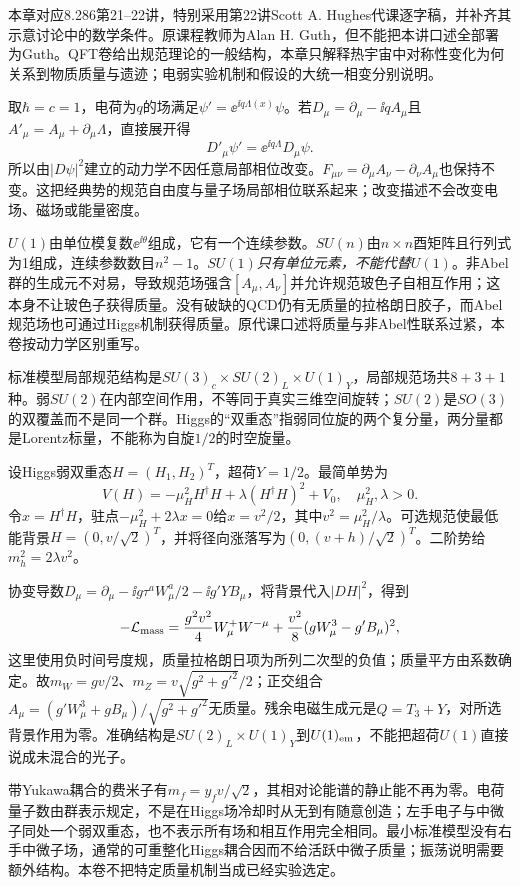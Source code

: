 本章对应8.286第21--22讲，特别采用第22讲Scott A. Hughes代课逐字稿，并补齐其示意讨论中的数学条件。原课程教师为Alan H. Guth，但不能把本讲口述全部署为Guth。QFT卷给出规范理论的一般结构，本章只解释热宇宙中对称性变化为何关系到物质质量与遗迹；电弱实验机制和假设的大统一相变分别说明。

取$\hbar=c=1$，电荷为$q$的场满足$\psi'=\ee^{\ii q\Lambda(x)}\psi$。若$D_\mu=\partial_\mu-\ii q A_\mu$且$A'_\mu=A_\mu+\partial_\mu\Lambda$，直接展开得
\[
 D'_\mu\psi'=\ee^{\ii q\Lambda}D_\mu\psi.
\]
所以由$|D\psi|^2$建立的动力学不因任意局部相位改变。$F_{\mu\nu}=\partial_\mu A_\nu-\partial_\nu A_\mu$也保持不变。这把经典势的规范自由度与量子场局部相位联系起来；改变描述不会改变电场、磁场或能量密度。

$U(1)$由单位模复数$\ee^{\ii\theta}$组成，它有一个连续参数。$SU(n)$由$n\times n$酉矩阵且行列式为1组成，连续参数数目$n^2-1$。\emph{$SU(1)$只有单位元素，不能代替$U(1)$}。非Abel群的生成元不对易，导致规范场强含$[A_\mu,A_\nu]$并允许规范玻色子自相互作用；这本身不让玻色子获得质量。没有破缺的QCD仍有无质量的拉格朗日胶子，而Abel规范场也可通过Higgs机制获得质量。原代课口述将质量与非Abel性联系过紧，本卷按动力学区别重写。

标准模型局部规范结构是$SU(3)_c\times SU(2)_L\times U(1)_Y$，局部规范场共$8+3+1$种。弱$SU(2)$在内部空间作用，不等同于真实三维空间旋转；$SU(2)$是$SO(3)$的双覆盖而不是同一个群。Higgs的“双重态”指弱同位旋的两个复分量，两分量都是Lorentz标量，不能称为自旋$1/2$的时空旋量。

设Higgs弱双重态$H=(H_1,H_2)^T$，超荷$Y=1/2$。最简单势为
\[
 V(H)=-\mu_H^2 H^\dagger H+\lambda(H^\dagger H)^2+V_0,
 \quad \mu_H^2,\lambda>0.
\]
令$x=H^\dagger H$，驻点$-\mu_H^2+2\lambda x=0$给$x=v^2/2$，其中$v^2=\mu_H^2/\lambda$。可选规范使最低能背景$H=(0,v/\sqrt2)^T$，并将径向涨落写为$(0,(v+h)/\sqrt2)^T$。二阶势给$m_h^2=2\lambda v^2$。

协变导数$D_\mu=\partial_\mu-\ii g\tau^aW^a_\mu/2-\ii g'YB_\mu$，将背景代入$|DH|^2$，得到
\[
 -\mathcal L_{\rm mass}=
 \frac{g^2v^2}{4}W^+_\mu W^{-\mu}
 +\frac{v^2}{8}(gW^3_\mu-g'B_\mu)^2,
\]
这里使用负时间号度规，质量拉格朗日项为所列二次型的负值；质量平方由系数确定。故$m_W=gv/2$、$m_Z=v\sqrt{g^2+g'^2}/2$；正交组合$A_\mu=(g'W^3_\mu+gB_\mu)/\sqrt{g^2+g'^2}$无质量。残余电磁生成元是$Q=T_3+Y$，对所选背景作用为零。准确结构是$SU(2)_L\times U(1)_Y$到$U(1)_{\rm em}$，不能把超荷$U(1)$直接说成未混合的光子。

带Yukawa耦合的费米子有$m_f=y_fv/\sqrt2$，其相对论能谱的静止能不再为零。电荷量子数由群表示规定，不是在Higgs场冷却时从无到有随意创造；左手电子与中微子同处一个弱双重态，也不表示所有场和相互作用完全相同。最小标准模型没有右手中微子场，通常的可重整化Higgs耦合因而不给活跃中微子质量；振荡说明需要额外结构。本卷不把特定质量机制当成已经实验选定。

